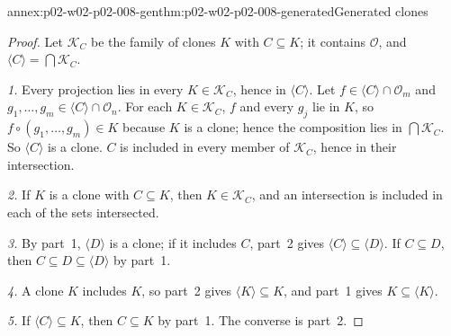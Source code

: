 \begin{annexitem}{annex:p02-w02-p02-008-gen}{thm:p02-w02-p02-008-generated}{Generated clones}
\begin{proof}
Let \(\mathcal K_C\) be the family of clones \(K\) with \(C\subseteq K\); it
contains \(\mathcal O\), and \(\langle C\rangle=\bigcap\mathcal K_C\).

\emph{1.}  Every projection lies in every \(K\in\mathcal K_C\), hence in
\(\langle C\rangle\).  Let \(f\in\langle C\rangle\cap\mathcal O_m\) and
\(g_1,\ldots,g_m\in\langle C\rangle\cap\mathcal O_n\).  For each
\(K\in\mathcal K_C\), \(f\) and every \(g_j\) lie in \(K\), so
\(f\circ(g_1,\ldots,g_m)\in K\) because \(K\) is a clone; hence the
composition lies in \(\bigcap\mathcal K_C\).  So \(\langle C\rangle\) is a
clone.  \(C\) is included in every member of \(\mathcal K_C\), hence in their
intersection.

\emph{2.}  If \(K\) is a clone with \(C\subseteq K\), then
\(K\in\mathcal K_C\), and an intersection is included in each of the sets
intersected.

\emph{3.}  By part~1, \(\langle D\rangle\) is a clone; if it includes \(C\),
part~2 gives \(\langle C\rangle\subseteq\langle D\rangle\).  If
\(C\subseteq D\), then \(C\subseteq D\subseteq\langle D\rangle\) by part~1.

\emph{4.}  A clone \(K\) includes \(K\), so part~2 gives
\(\langle K\rangle\subseteq K\), and part~1 gives \(K\subseteq\langle
K\rangle\).

\emph{5.}  If \(\langle C\rangle\subseteq K\), then \(C\subseteq K\) by
part~1.  The converse is part~2.
\end{proof}
\end{annexitem}

